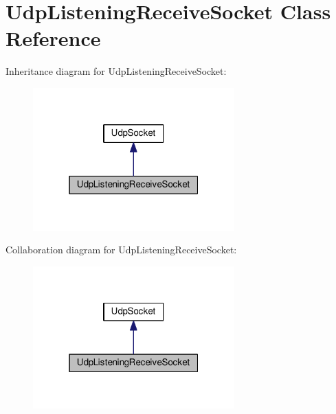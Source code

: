 \hypertarget{class_udp_listening_receive_socket}{}\section{Udp\+Listening\+Receive\+Socket Class Reference}
\label{class_udp_listening_receive_socket}


Inheritance diagram for Udp\+Listening\+Receive\+Socket\+:\nopagebreak
\begin{figure}[H]
\begin{center}
\leavevmode
\includegraphics[width=220pt]{class_udp_listening_receive_socket__inherit__graph}
\end{center}
\end{figure}


Collaboration diagram for Udp\+Listening\+Receive\+Socket\+:\nopagebreak
\begin{figure}[H]
\begin{center}
\leavevmode
\includegraphics[width=220pt]{class_udp_listening_receive_socket__coll__graph}
\end{center}
\end{figure}
